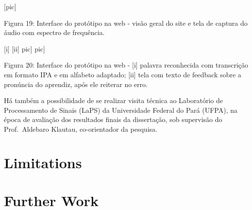                                 [pic]

Figura 19: Interface do prot\'otipo na web - vis\~ao geral do site e tela de
captura do \'audio com espectro de frequ\^encia.

\textbar{} {[}i{]} \textbar{} {[}ii{]} \textbar{} \textbar{}{[}pic{]}
\textbar{}{[}pic{]} \textbar{}

Figura 20: Interface do prot\'otipo na web - {[}i{]} palavra reconhecida
com transcri\c{c}\~ao em formato IPA e em alfabeto adaptado; {[}ii{]} tela com
texto de feedback sobre a pron\'uncia do aprendiz, ap\'os ele reiterar no
erro.

H\'a tamb\'em a possibilidade de se realizar visita t\'ecnica ao Laborat\'orio
de Processamento de Sinais (LaPS) da Universidade Federal do Par\'a
(UFPA), na \'epoca de avalia\c{c}\~ao dos resultados finais da disserta\c{c}\~ao, sob
supervis\~ao do Prof.~Aldebaro Klautau, co-orientador da pesquisa.

\section{Limitations}\label{sec:limitations}
\section{Further Work}\label{sec:further-work}


